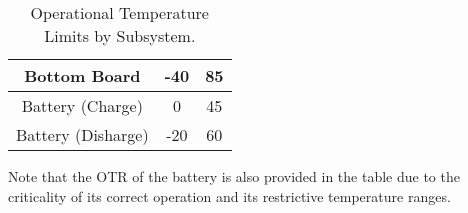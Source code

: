 \begin{table}[H]
\begin{tabular}{ccc}
  Bottom Board                                                                             & -40                             & 85                              \\ \hline
  Battery (Charge)                                                                         & 0                               & 45                              \\
  Battery (Disharge)                                                                       & -20                             & 60                              \\ \hline           
  \end{tabular}
  \caption{Operational Temperature Limits by Subsystem.}
  \label{tab:optemplimits}
\end{table}

Note that the \ac{OTR} of the battery is also provided in the table due to the criticality of its correct
operation and its restrictive temperature ranges.